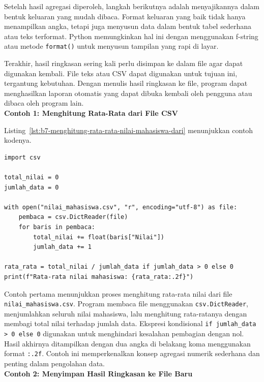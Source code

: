 Setelah hasil agregasi diperoleh, langkah berikutnya adalah menyajikannya dalam bentuk keluaran yang mudah dibaca. Format keluaran yang baik tidak hanya menampilkan angka, tetapi juga menyusun data dalam bentuk tabel sederhana atau teks terformat. Python memungkinkan hal ini dengan menggunakan f-string atau metode \texttt{format()} untuk menyusun tampilan yang rapi di layar.

Terakhir, hasil ringkasan sering kali perlu disimpan ke dalam file agar dapat digunakan kembali. File teks atau CSV dapat digunakan untuk tujuan ini, tergantung kebutuhan. Dengan menulis hasil ringkasan ke file, program dapat menghasilkan laporan otomatis yang dapat dibuka kembali oleh pengguna atau dibaca oleh program lain.\\

\noindent\textbf{Contoh 1: Menghitung Rata-Rata dari File CSV}

Listing~\ref{lst:b7-menghitung-rata-rata-nilai-mahasiswa-dari} menunjukkan contoh kodenya.

\begin{lstlisting}[style=PythonStyle, caption={Menghitung rata-rata nilai mahasiswa dari file CSV}, label={lst:b7-menghitung-rata-rata-nilai-mahasiswa-dari}]
import csv

total_nilai = 0
jumlah_data = 0

with open("nilai_mahasiswa.csv", "r", encoding="utf-8") as file:
    pembaca = csv.DictReader(file)
    for baris in pembaca:
        total_nilai += float(baris["Nilai"])
        jumlah_data += 1

rata_rata = total_nilai / jumlah_data if jumlah_data > 0 else 0
print(f"Rata-rata nilai mahasiswa: {rata_rata:.2f}")
\end{lstlisting}

Contoh pertama menunjukkan proses menghitung rata-rata nilai dari file \texttt{nilai\_mahasiswa.csv}. Program membaca file menggunakan \texttt{csv.DictReader}, menjumlahkan seluruh nilai mahasiswa, lalu menghitung rata-ratanya dengan membagi total nilai terhadap jumlah data. Ekspresi kondisional \texttt{if jumlah\_data > 0 else 0} digunakan untuk menghindari kesalahan pembagian dengan nol. Hasil akhirnya ditampilkan dengan dua angka di belakang koma menggunakan format \texttt{:.2f}. Contoh ini memperkenalkan konsep agregasi numerik sederhana dan penting dalam pengolahan data.\\

\noindent\textbf{Contoh 2: Menyimpan Hasil Ringkasan ke File Baru}

